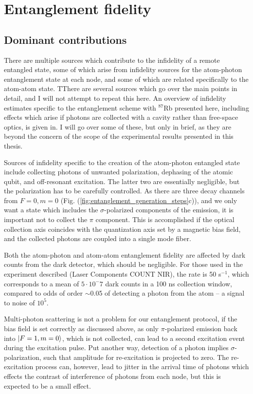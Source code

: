 \section{Entanglement fidelity}

\subsection{Dominant contributions}

There are multiple sources which contribute to the infidelity of a remote entangled state, some of which arise from infidelity sources for the atom-photon entanglement state at each node, and some of which are related specifically to the atom-atom state. TThere are several sources which go over the main points in detail, and I will not attempt to repeat this here. An overview of infidelity estimates specific to the entanglement scheme with $^{87}$Rb presented here, including effects which arise if photons are collected with a cavity rather than free-space optics, is given in\cite{Young2022}. I will go over some of these, but only in brief, as they are beyond the concern of the scope of the experimental results presented in this thesis.

Sources of infidelity specific to the creation of the atom-photon entangled state include collecting photons of unwanted polarization, dephasing of the atomic qubit, and off-resonant excitation. The latter two are essentially negligible, but the polarization has to be carefully controlled. As there are three decay channels from $F=0, m=0$ (Fig. (\ref{fig:entanglement_generation_steps}c)), and we only want a state which includes the $\sigma$-polarized components of the emission, it is important not to collect the $\pi$ component. This is accomplished if the optical collection axis coincides with the quantization axis set by a magnetic bias field, and the collected photons are coupled into a single mode fiber.

Both the atom-photon and atom-atom entanglement fidelity are affected by dark counts from the dark detector, which should be negligible. For those used in the experiment described (Laser Components COUNT NIR), the rate is 50 s$^{-1}$, which corresponds to a mean of $5\cdot 10^-7$ dark counts in a 100 ns collection window, compared to odds of order $\sim$0.05 of detecting a photon from the atom -- a signal to noise of $10^5$.

Multi-photon scattering is not a problem for our entanglement protocol, if the bias field is set correctly as discussed above, as only $\pi$-polarized emission back into $\ket{F=1,m=0}$, which is not collected, can lead to a second excitation event during the excitation pulse. Put another way, detection of a photon implies $\sigma$-polarization, such that amplitude for re-excitation is projected to zero. The re-excitation process can, however, lead to jitter in the arrival time of photons which effects the contrast of interference of photons from each node, but this is expected to be a small effect.

